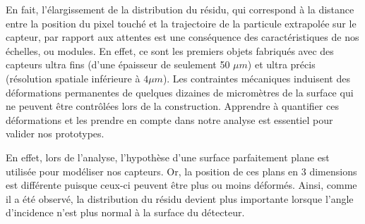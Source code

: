 \documentclass[a4papper, 10pt]{article}
\begin{document}
        En fait, l'élargissement de la distribution du résidu, qui correspond à la distance entre la position du pixel touché et la trajectoire de la particule extrapolée sur le capteur, par rapport aux attentes est une conséquence des caractéristiques de nos échelles, ou modules. En effet, ce sont les premiers objets fabriqués avec des capteurs ultra fins (d'une épaisseur de seulement 50 $\mu m$) et ultra précis (résolution spatiale inférieure à $4\mu m$). Les contraintes mécaniques induisent des déformations permanentes de quelques dizaines de micromètres de la surface qui ne peuvent être contrôlées lors de la construction.
        Apprendre à quantifier ces déformations et les prendre en compte dans notre analyse est essentiel pour valider nos prototypes.

        En effet, lors de l'analyse, l'hypothèse d'une surface parfaitement plane est utilisée pour modéliser nos capteurs. Or, la position de ces plans en 3 dimensions est différente puisque ceux-ci peuvent être plus ou moins déformés.
        Ainsi, comme il a été observé, la distribution du résidu devient plus importante lorsque l'angle d'incidence n'est plus normal à la surface du détecteur.
\end{document}
